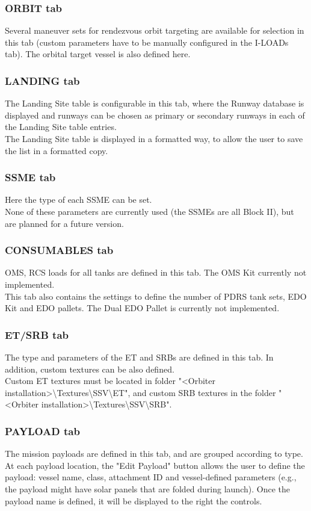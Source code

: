 \documentclass[Space_Shuttle_Vessel_Manual.tex]{subfiles}
\begin{document}
\begin{multicols*}{2}
\subsubsection{ORBIT tab}
Several maneuver sets for rendezvous orbit targeting are available for selection in this tab (custom parameters have to be manually configured in the I-LOADs tab). The orbital target vessel is also defined here.


\subsubsection{LANDING tab}
The Landing Site table is configurable in this tab, where the Runway database is displayed and runways can be chosen as primary or secondary runways in each of the Landing Site table entries.\\
The Landing Site table is displayed in a formatted way, to allow the user to save the list in a formatted copy.


\subsubsection{SSME tab}
Here the type of each SSME can be set.\\
None of these parameters are currently used (the SSMEs are all Block II), but are planned for a future version.


\subsubsection{CONSUMABLES tab}
OMS, RCS loads for all tanks are defined in this tab. The OMS Kit currently not implemented.\\
This tab also contains the settings to define the number of PDRS tank sets, EDO Kit and EDO pallets. The Dual EDO Pallet is currently not implemented.


\subsubsection{ET/SRB tab}
The type and parameters of the ET and SRBs are defined in this tab. In addition, custom textures can be also defined.\\
Custom ET textures must be located in folder "<Orbiter installation>\textbackslash Textures\textbackslash SSV\textbackslash ET", and custom SRB textures in the folder "<Orbiter installation>\textbackslash Textures\textbackslash SSV\textbackslash SRB".


\subsubsection{PAYLOAD tab}
The mission payloads are defined in this tab, and are grouped according to type.\\
At each payload location, the "Edit Payload" button allows the user to define the payload: vessel name, class, attachment ID and vessel-defined parameters (e.g., the payload might have solar panels that are folded during launch). Once the payload name is defined, it will be displayed to the right the controls.


\end{multicols*}
\end{document}
